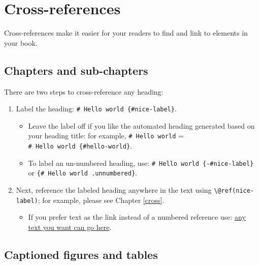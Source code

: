 \documentclass[
  11pt,
  twoside]{book}
\providecommand{\tightlist}{%
  \setlength{\itemsep}{0pt}\setlength{\parskip}{0pt}}
\theoremstyle{definition}
\theoremstyle{definition}
\theoremstyle{definition}
\theoremstyle{definition}
\theoremstyle{remark}
\begin{document}
\hypertarget{cross}{%
\chapter*{Cross-references}\label{cross}}

Cross-references make it easier for your readers to find and link to elements in your book.

\hypertarget{chapters-and-sub-chapters}{%
\section{Chapters and sub-chapters}\label{chapters-and-sub-chapters}}

There are two steps to cross-reference any heading:

\begin{enumerate}
\def\labelenumi{\arabic{enumi}.}
\tightlist
\item
  Label the heading: \texttt{\#\ Hello\ world\ \{\#nice-label\}}.

  \begin{itemize}
  \tightlist
  \item
    Leave the label off if you like the automated heading generated based on your heading title: for example, \texttt{\#\ Hello\ world} = \texttt{\#\ Hello\ world\ \{\#hello-world\}}.
  \item
    To label an un-numbered heading, use: \texttt{\#\ Hello\ world\ \{-\#nice-label\}} or \texttt{\{\#\ Hello\ world\ .unnumbered\}}.
  \end{itemize}
\item
  Next, reference the labeled heading anywhere in the text using \texttt{\textbackslash{}@ref(nice-label)}; for example, please see Chapter \ref{cross}.

  \begin{itemize}
  \tightlist
  \item
    If you prefer text as the link instead of a numbered reference use: \protect\hyperlink{cross}{any text you want can go here}.
  \end{itemize}
\end{enumerate}

\hypertarget{captioned-figures-and-tables}{%
\section{Captioned figures and tables}\label{captioned-figures-and-tables}}
\end{document}

